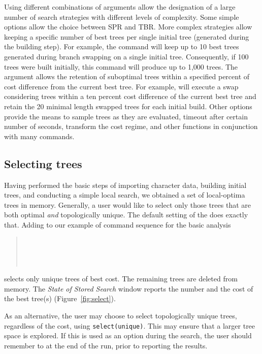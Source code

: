 {Using different combinations of  arguments allow the designation of a  large number of search 
strategies with different levels of complexity. Some simple options allow the choice between SPR and TBR. More 
complex strategies allow keeping a specific number of best trees per single initial tree (generated during the building step). 
For example, the command  will keep up to 10 best trees generated during branch swapping 
on a single initial tree. Consequently, if 100 trees were built initially, this command will produce up to 1,000 trees. The 
argument  allows the retention of suboptimal trees within a specified percent of cost difference 
from the current best tree. For example,  will execute a swap considering 
trees within a ten percent cost difference of the current best tree and retain the 20 minimal length swapped trees for each 
initial build. Other options provide the means to sample trees as they are evaluated, timeout after certain number of seconds, 
transform the cost regime, and other functions in conjunction with many \poy commands.

\subsection{Selecting trees}

Having performed the basic steps of importing character data, building initial trees, and conducting a simple local search, 
we obtained a set of local-optima trees in memory. Generally, a user would like to select only those trees that are 
both optimal \emph{and} topologically unique. The default setting of the  does exactly that. 
Adding  to our example of command sequence for the basic analysis 
\begin{quote}
 	\\
 	\\
	\\
\end{quote}
selects only unique trees of best cost. The remaining trees are deleted from memory. The \emph{State of Stored Search} 
window reports the number and the cost of the best tree(s) (Figure~\ref{fig:select}).

As an alternative, the user may choose to select topologically unique trees, regardless of the cost, using 
\texttt{select(unique)}.  This may ensure that a larger tree space is explored.  If this is used as an option during the 
search, the user should remember to   at the end of the run, prior to reporting the results.

}
